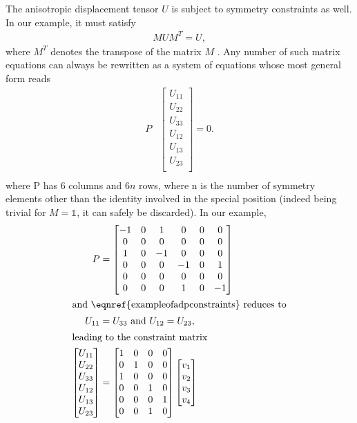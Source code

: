 \documentclass[pdf]{iucr}
\newcommand{\identity}{\mathbb{1}}
\begin{document}
The anisotropic displacement tensor $U$ is subject to symmetry constraints as well. In our example, it must satisfy
\begin{align}
M U M^T = U,
\label{eqn:special:pos:adp:constraint}
\end{align}
where $M^T$ denotes the transpose of the matrix $M$ \textbookref. Any number of such matrix equations can always be rewritten as a system of equations whose most general form reads
\begin{align}
P &\begin{bmatrix}
U_{11}\\
U_{22}\\
U_{33}\\
U_{12}\\
U_{13}\\
U_{23}\\
\end{bmatrix} = 0.\label{eqn:exampleofadpconstraints}\\
\end{align}
where P has 6 columns and $6n$ rows, where n is the number of symmetry elements other than the identity involved in the special position (indeed  being trivial for $M=\identity$, it can safely be discarded). In our example,
\begin{align}
P &= \begin{bmatrix}
-1 & 0 & 1 & 0 & 0 & 0\\
0 & 0 & 0 & 0 & 0 & 0\\
1 & 0 & -1 & 0 & 0 & 0\\
0 & 0 & 0 & -1 & 0 & 1\\
0 & 0 & 0 & 0 & 0 & 0\\
0 & 0 & 0 & 1 & 0 & -1
\end{bmatrix}\\
\shortintertext{and \eqnref{exampleofadpconstraints} reduces to}
U_{11} &= U_{33}\text{ and } U_{12} = U_{23},\\
\shortintertext{leading to the constraint matrix}
\begin{bmatrix}
U_{11}\\
U_{22}\\
U_{33}\\
U_{12}\\
U_{13}\\
U_{23}\\
\end{bmatrix} &= \begin{bmatrix}
1 & 0 & 0 & 0\\
0 & 1 & 0 & 0\\
1 & 0 & 0 & 0\\
0 & 0 & 1 & 0\\
0 & 0 & 0 & 1\\
0 & 0 & 1 & 0
\end{bmatrix} \begin{bmatrix}
v_1\\
v_2\\
v_3\\
v_4
\end{bmatrix}
\end{align} 
\end{document}
